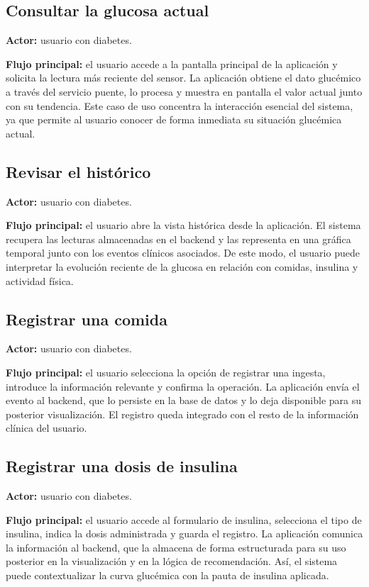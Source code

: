 \subsection{Consultar la glucosa actual}

\textbf{Actor:} usuario con diabetes.

\textbf{Flujo principal:} el usuario accede a la pantalla principal de la aplicación y
solicita la lectura más reciente del sensor. La aplicación obtiene el dato glucémico a
través del servicio puente, lo procesa y muestra en pantalla el valor actual junto con su
tendencia. Este caso de uso concentra la interacción esencial del sistema, ya que permite
al usuario conocer de forma inmediata su situación glucémica actual.

\subsection{Revisar el histórico}

\textbf{Actor:} usuario con diabetes.

\textbf{Flujo principal:} el usuario abre la vista histórica desde la aplicación. El
sistema recupera las lecturas almacenadas en el backend y las representa en una gráfica
temporal junto con los eventos clínicos asociados. De este modo, el usuario puede
interpretar la evolución reciente de la glucosa en relación con comidas, insulina y
actividad física.

\subsection{Registrar una comida}

\textbf{Actor:} usuario con diabetes.

\textbf{Flujo principal:} el usuario selecciona la opción de registrar una ingesta,
introduce la información relevante y confirma la operación. La aplicación envía el evento
al backend, que lo persiste en la base de datos y lo deja disponible para su posterior
visualización. El registro queda integrado con el resto de la información clínica del
usuario.

\subsection{Registrar una dosis de insulina}

\textbf{Actor:} usuario con diabetes.

\textbf{Flujo principal:} el usuario accede al formulario de insulina, selecciona el tipo
de insulina, indica la dosis administrada y guarda el registro. La aplicación comunica la
información al backend, que la almacena de forma estructurada para su uso posterior en la
visualización y en la lógica de recomendación. Así, el sistema puede contextualizar la
curva glucémica con la pauta de insulina aplicada.

